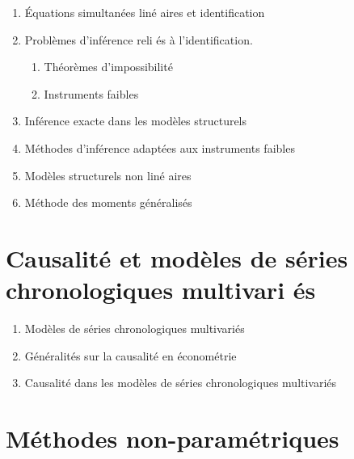 \documentclass[titlepage,11pt,amstex]{article}
\begin{document}
\begin{enumerate}
\item \label{Simultaneous equations}\'{E}quations simultan\'{e}es lin\'{e}%
aires et identification

\item \label{Identification and inference}Probl\`{e}mes d'inf\'{e}rence reli%
\'{e}s \`{a} l'identification.

\begin{enumerate}
\item \label{Impossibility theorems}Th\'{e}or\`{e}mes d'impossibilit\'{e}

\item \label{Weak instruments}Instruments faibles
\end{enumerate}

\item \label{Exact inference in structural models}Inf\'{e}rence exacte dans
les mod\`{e}les structurels

\item \label{Methods adapted to WI}M\'{e}thodes d'inf\'{e}rence adapt\'{e}es
aux instruments faibles

\item \label{Nonlinear structural models}Mod\`{e}les structurels non lin\'{e}%
aires

\item \label{GMM}M\'{e}thode des moments g\'{e}n\'{e}ralis\'{e}s
\end{enumerate}

\section{Causalit\'{e} et mod\`{e}les de s\'{e}ries chronologiques multivari%
\'{e}s}

\begin{enumerate}
\item Mod\`{e}les de s\'{e}ries chronologiques multivari\'{e}s

\item G\'{e}n\'{e}ralit\'{e}s sur la causalit\'{e} en \'{e}conom\'{e}trie

\item Causalit\'{e} dans les mod\`{e}les de s\'{e}ries chronologiques
multivari\'{e}s
\end{enumerate}

\section{M\'{e}thodes non-param\'{e}triques}
\end{document}
